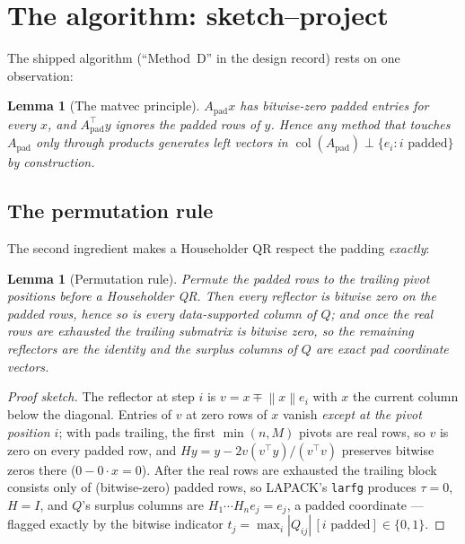 \documentclass[11pt]{article}
\newtheorem{lemma}[theorem]{Lemma}
\theoremstyle{definition}
\theoremstyle{remark}
\newcommand{\Apad}{A_{\mathrm{pad}}}
\newcommand{\col}{\operatorname{col}}
\newcommand{\norm}[1]{\left\lVert #1 \right\rVert}
\newcommand{\code}[1]{\texttt{#1}}
\begin{document}
\section{The algorithm: sketch--project}\label{sec:alg}

The shipped algorithm (``Method~D'' in the design record) rests on one observation:

\begin{lemma}[The matvec principle]\label{lem:matvec}
$\Apad x$ has bitwise-zero padded entries for every $x$, and $\Apad^{\top}y$ ignores the padded
rows of $y$. Hence any method that touches $\Apad$ only through products generates left vectors in
$\col(\Apad)\perp\{e_i: i\text{ padded}\}$ by construction.
\end{lemma}

\subsection{The permutation rule}\label{sec:perm}

The second ingredient makes a Householder QR respect the padding \emph{exactly}:

\begin{lemma}[Permutation rule]\label{lem:perm}
Permute the padded rows to the trailing pivot positions before a Householder QR. Then every
reflector is bitwise zero on the padded rows, hence so is every data-supported column of $Q$; and
once the real rows are exhausted the trailing submatrix is bitwise zero, so the remaining
reflectors are the identity and the surplus columns of $Q$ are \emph{exact} pad coordinate
vectors.
\end{lemma}

\begin{proof}[Proof sketch]
The reflector at step $i$ is $v = x \mp \norm{x}e_i$ with $x$ the current column below the
diagonal. Entries of $v$ at zero rows of $x$ vanish \emph{except at the pivot position $i$}; with
pads trailing, the first $\min(n,M)$ pivots are real rows, so $v$ is zero on every padded row, and
$Hy = y - 2v(v^{\top}y)/(v^{\top}v)$ preserves bitwise zeros there ($0 - 0\cdot x = 0$). After the
real rows are exhausted the trailing block consists only of (bitwise-zero) padded rows, so LAPACK's
\code{larfg} produces $\tau = 0$, $H = I$, and $Q$'s surplus columns are
$H_1\cdots H_n e_j = e_j$, a padded coordinate --- flagged exactly by the bitwise indicator
$t_j = \max_i |Q_{ij}|\,[i\text{ padded}] \in \{0,1\}$.
\end{proof}
\end{document}
